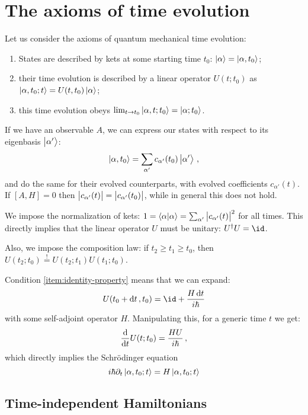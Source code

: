 \documentclass[main.tex]{subfiles}
\begin{document}
\section{The axioms of time evolution}

Let us consider the axioms of quantum mechanical time evolution:

\begin{enumerate}
    \item States are described by kets at some starting time \(t_0\): \(\ket{\alpha} = \ket{\alpha, t_0}\);
    \item their time evolution is described by a linear operator \(U(t; t_0)\) as \(\ket{\alpha, t_0 ; t} = U(t, t_0) \ket{\alpha}\);
    \item this time evolution obeys \(\lim_{t \rightarrow t_0} \ket{\alpha, t;t_0}  = \ket{\alpha; t_0} \). \label{item:identity-property}
\end{enumerate}

If we have an observable \(A\), we can express our states with respect to its  eigenbasis \(\ket{\alpha'} \):
%
\begin{equation}
  \ket{\alpha, t_0} = \sum _{\alpha'} c_{\alpha'} (t_0) \ket{\alpha'}\,,
\end{equation}
and do the same for their evolved counterparts, with evolved coefficients \(c_{\alpha'}(t)\).
If \([A, H]=0\) then \(\abs{c_{\alpha'}(t)} = \abs{c_{\alpha'}(t_0)} \), while in general this does not hold.

We impose the normalization of kets: \(1 = \braket{\alpha}{\alpha} = \sum _{\alpha'} \abs{c_{\alpha'}(t)}^2 \) for all times. This directly implies that the linear operator \(U\) must be unitary: \(U^\dag U = \id\).

Also, we impose the composition law: if \(t_2 \geq t_1 \geq t_0\), then \(U(t_2;t_0) \overset{!}{=} U(t_2;t_1) U(t_1;t_0)\).

Condition \ref{item:identity-property} means that we can expand:
%
\begin{equation}
  U(t_0 + \dd{t}, t_0) = \id + \frac{H \dd{t}}{i \hbar}
\end{equation}
%
with some self-adjoint operator \(H\).
Manipulating this, for a generic time \(t\) we get:
%
\begin{equation}
  \dv{}{t} U(t;t_0) = \frac{HU}{i \hbar} \,,
\end{equation}
%
which directly implies the Schrödinger equation
%
\begin{equation}
  i \hbar \partial_t \ket{\alpha, t_0; t} = H \ket{\alpha, t_0; t}
\end{equation}

\subsection{Time-independent Hamiltonians}
\end{document}

